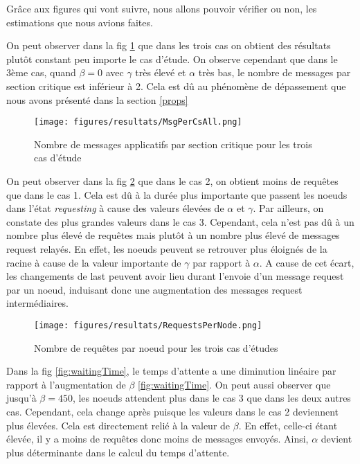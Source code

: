 \documentclass[12pt,a4paper]{article}
\begin{document}
Grâce aux figures qui vont suivre, nous allons pouvoir vérifier ou non, les estimations que nous avions faites.

On peut observer dans la fig \ref{fig:msgPerCs} que dans les trois cas on obtient des résultats plutôt constant peu importe le cas d'étude. On observe cependant que dans le 3ème cas, quand $\beta = 0$ avec $\gamma$ très élevé et $\alpha$ très bas, le nombre de messages par section critique est inférieur à 2. Cela est dû au phénomène de dépassement que nous avons présenté dans la section \ref{props}

\begin{figure}[h!]
    \centering
    \texttt{[image: figures/resultats/MsgPerCsAll.png]}
    \caption{Nombre de messages applicatifs par section critique pour les trois cas d'étude}
    \label{fig:msgPerCs}
\end{figure}

 On peut observer dans la fig \ref{fig:reqCount} que dans le cas 2, on obtient moins de requêtes que dans le cas 1. Cela est dû à la durée plus importante que passent les noeuds dans l'état \textit{requesting} à cause des valeurs élevées de $\alpha$ et $\gamma$. Par ailleurs, on constate des plus grandes valeurs dans le cas 3. Cependant, cela n'est pas dû à un nombre plus élevé de requêtes mais plutôt à un nombre plus élevé de messages request relayés. En effet, les noeuds peuvent se retrouver plus éloignés de la racine à cause de la valeur importante de $\gamma$ par rapport à $\alpha$. A cause de cet écart, les changements de last peuvent avoir lieu durant l'envoie d'un message request par un noeud, induisant donc une augmentation des messages request intermédiaires.

\begin{figure}[h!]
    \centering
    \texttt{[image: figures/resultats/RequestsPerNode.png]}
    \caption{Nombre de requêtes par noeud pour les trois cas d'études}
    \label{fig:reqCount}
\end{figure}

Dans la fig \ref{fig:waitingTime}, le temps d'attente a une diminution linéaire par rapport à l'augmentation de $\beta$ \ref{fig:waitingTime}. On peut aussi observer que jusqu'à $\beta = 450$, les noeuds attendent plus dans le cas 3 que dans les deux autres cas. Cependant, cela change après puisque les valeurs dans le cas 2 deviennent plus élevées. Cela est directement relié à la valeur de $\beta$. En effet, celle-ci étant élevée, il y a moins de requêtes donc moins de messages envoyés. Ainsi, $\alpha$ devient plus déterminante dans le calcul du temps d'attente. 
\end{document}
